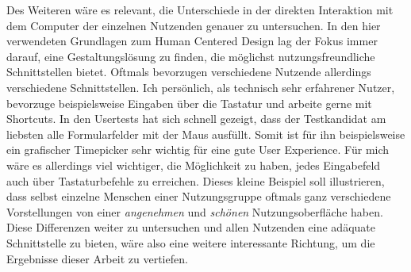 Des Weiteren wäre es relevant, die Unterschiede in der direkten Interaktion mit
dem Computer der einzelnen Nutzenden genauer zu untersuchen. In den hier
verwendeten Grundlagen zum Human Centered Design lag der Fokus immer darauf,
eine Gestaltungslösung zu finden, die möglichst nutzungsfreundliche
Schnittstellen bietet. Oftmals bevorzugen verschiedene Nutzende
allerdings verschiedene Schnittstellen. Ich persönlich, als technisch sehr
erfahrener Nutzer, bevorzuge beispielsweise Eingaben über die Tastatur und
arbeite gerne mit Shortcuts. In den Usertests hat sich schnell gezeigt, dass
der Testkandidat am liebsten alle Formularfelder mit der Maus ausfüllt. Somit
ist für ihn beispielsweise ein grafischer Timepicker sehr wichtig für eine gute
User Experience. Für mich wäre es allerdings viel wichtiger, die Möglichkeit zu
haben, jedes Eingabefeld auch über Tastaturbefehle zu erreichen. Dieses kleine
Beispiel soll illustrieren, dass selbst einzelne Menschen einer Nutzungsgruppe
oftmals ganz verschiedene Vorstellungen von einer \textit{angenehmen} und
\textit{schönen} Nutzungsoberfläche haben. Diese Differenzen weiter zu
untersuchen und allen Nutzenden eine adäquate Schnittstelle zu bieten, wäre also
eine weitere interessante Richtung, um die Ergebnisse dieser Arbeit zu
vertiefen.